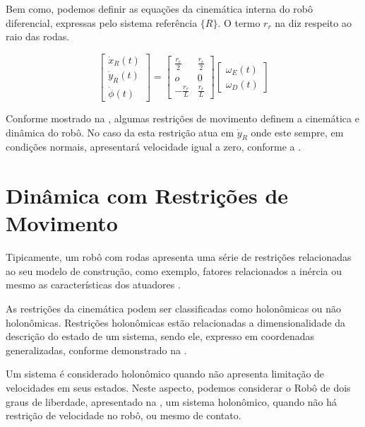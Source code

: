 Bem como, podemos definir as equações da cinemática interna do robô diferencial, expressas pelo sistema referência $\{R\}$. O termo $r_r$ na  diz respeito ao raio das rodas. 

\begin{equation}
    \begin{bmatrix}
        \dot{x}_R(t) \\ \dot{y}_R(t) \\ \dot{\phi}(t)
    \end{bmatrix}
    =
    \begin{bmatrix}
        \frac{r_r}{2} & \frac{r_r}{2} \\
        o & 0 \\
        -\frac{r_r}{L} & \frac{r_r}{L}
    \end{bmatrix}
    \begin{bmatrix}
        \omega_E(t) \\ \omega_D(t)
    \end{bmatrix}
        \label{eq:cinerd6}
\end{equation}

Conforme mostrado na , algumas restrições de movimento definem a cinemática e dinâmica do robô. No caso da  esta restrição atua em $\dot{y}_R$ onde este sempre, em condições normais, apresentará velocidade igual a zero, conforme a .

\section{Dinâmica com Restrições de Movimento}

Tipicamente, um robô com rodas apresenta uma série de restrições relacionadas ao seu modelo de construção, como exemplo, fatores relacionados a inércia ou mesmo as características dos atuadores \cite{klancar2017wheeled}.

As restrições da cinemática podem ser classificadas como holonômicas ou não holonômicas. Restrições holonômicas estão relacionadas a dimensionalidade da descrição do estado de um sistema, sendo ele, expresso em coordenadas generalizadas, conforme demonstrado na .

Um sistema é considerado holonômico quando não apresenta limitação de velocidades em seus estados. Neste aspecto, podemos considerar o Robô de dois graus de liberdade, apresentado na , um sistema holonômico, quando não há restrição de velocidade no robô, ou mesmo de contato.

